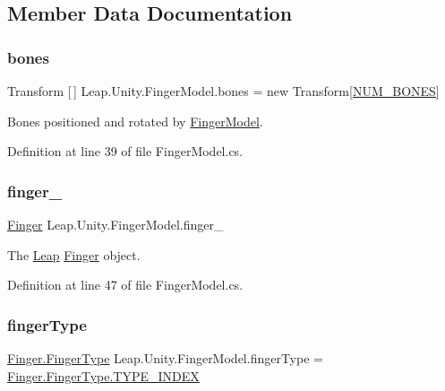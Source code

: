 \subsection{Member Data Documentation}
\mbox{\label{class_leap_1_1_unity_1_1_finger_model_a9dc2230af982027edd82f9952a1267a6}} 
\subsubsection{\texorpdfstring{bones}{bones}}
{\footnotesize\ttfamily Transform \mbox{[}$\,$\mbox{]} Leap.\+Unity.\+Finger\+Model.\+bones = new Transform\mbox{[}\mbox{\hyperlink{class_leap_1_1_unity_1_1_finger_model_a35043ac951361f61a591a5a69083ab8c}{N\+U\+M\+\_\+\+B\+O\+N\+ES}}\mbox{]}}

Bones positioned and rotated by \mbox{\hyperlink{class_leap_1_1_unity_1_1_finger_model}{Finger\+Model}}. 

Definition at line 39 of file Finger\+Model.\+cs.

\mbox{\label{class_leap_1_1_unity_1_1_finger_model_a8b4b5c124b754ee09e0b032618f7e666}} 
\subsubsection{\texorpdfstring{finger\_}{finger\_}}
{\footnotesize\ttfamily \mbox{\hyperlink{class_leap_1_1_finger}{Finger}} Leap.\+Unity.\+Finger\+Model.\+finger\+\_\+\hspace{0.3cm}{\ttfamily [protected]}}

The \mbox{\hyperlink{namespace_leap_1_1_unity_1_1_leap}{Leap}} \mbox{\hyperlink{class_leap_1_1_finger}{Finger}} object. 

Definition at line 47 of file Finger\+Model.\+cs.

\mbox{\label{class_leap_1_1_unity_1_1_finger_model_a21c5f56f4dd6fba09212d1738811eecb}} 
\subsubsection{\texorpdfstring{fingerType}{fingerType}}
{\footnotesize\ttfamily \mbox{\hyperlink{class_leap_1_1_finger_ae75e8d46a01aff0bd5c6d6fb99e2f2ba}{Finger.\+Finger\+Type}} Leap.\+Unity.\+Finger\+Model.\+finger\+Type = \mbox{\hyperlink{class_leap_1_1_finger_ae75e8d46a01aff0bd5c6d6fb99e2f2baae935a2bcf041187b5d3530f6084c5914}{Finger.\+Finger\+Type.\+T\+Y\+P\+E\+\_\+\+I\+N\+D\+EX}}}



